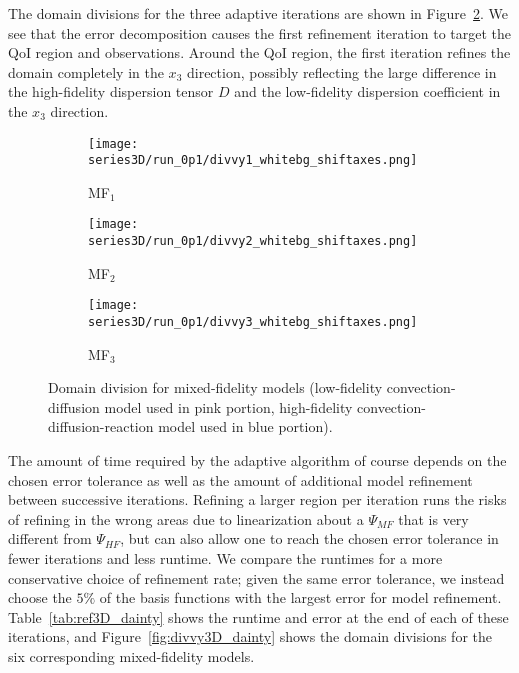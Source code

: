 The domain divisions for the three adaptive iterations are shown in Figure~\ref{fig:divvy3D}. We see that the error decomposition causes the first refinement iteration to target the QoI region and observations. Around the QoI region, the first iteration refines the domain completely in the $x_3$ direction, possibly reflecting the large difference in the high-fidelity dispersion tensor $D$ and the low-fidelity dispersion coefficient in the $x_3$ direction.
%
\begin{figure}[h]
\centering
\begin{subfigure}[t]{0.32\textwidth}
\centering
\texttt{[image: series3D/run\_0p1/divvy1\_whitebg\_shiftaxes.png]} 
\caption{MF$_1$}
\label{fig:ref3D_1}
\end{subfigure}
\begin{subfigure}[t]{0.32\textwidth}
\centering
\texttt{[image: series3D/run\_0p1/divvy2\_whitebg\_shiftaxes.png]} 
\caption{MF$_2$}
\end{subfigure}
\begin{subfigure}[t]{0.32\textwidth}
\centering
\texttt{[image: series3D/run\_0p1/divvy3\_whitebg\_shiftaxes.png]} 
\caption{MF$_3$}
\end{subfigure}
\caption{Domain division for mixed-fidelity models (low-fidelity convection-diffusion model used in pink portion, high-fidelity convection-diffusion-reaction model used in blue portion).}
\label{fig:divvy3D}
\end{figure} 
%
The amount of time required by the adaptive algorithm of course depends on the chosen error tolerance as well as the amount of additional model refinement between successive iterations. Refining a larger region per iteration runs the risks of refining in the wrong areas due to linearization about a $\Psi_{MF}$ that is very different from $\Psi_{HF}$, but can also allow one to reach the chosen error tolerance in fewer iterations and less runtime. We compare the runtimes for a more conservative choice of refinement rate; given the same error tolerance, we instead choose the $5\%$ of the basis functions with the largest error for model refinement. Table~\ref{tab:ref3D_dainty} shows the runtime and error at the end of each of these iterations, and Figure~\ref{fig:divvy3D_dainty} shows the domain divisions for the six corresponding mixed-fidelity models.
%
